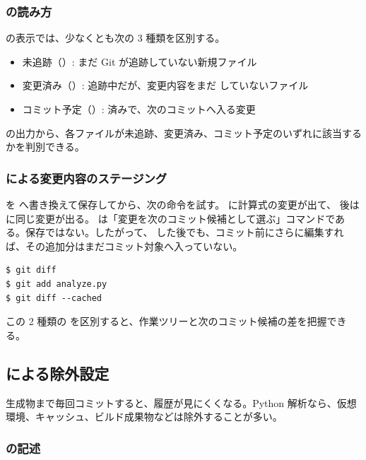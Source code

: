 \subsubsection{ の読み方}

 の表示では、少なくとも次の 3 種類を区別する。

\begin{itemize}
\item 未追跡（）: まだ Git が追跡していない新規ファイル
\item 変更済み（）: 追跡中だが、変更内容をまだ  していないファイル
\item コミット予定（）:  済みで、次のコミットへ入る変更
\end{itemize}

 の出力から、各ファイルが未追跡、変更済み、コミット予定のいずれに該当するかを判別できる。

\subsubsection{ による変更内容のステージング}

 を  へ書き換えて保存してから、次の命令を試す。 に計算式の変更が出て、 後は  に同じ変更が出る。 は「変更を次のコミット候補として選ぶ」コマンドである。保存ではない。したがって、 した後でも、コミット前にさらに編集すれば、その追加分はまだコミット対象へ入っていない。

\begin{lstlisting}[numbers=none, xleftmargin=2\zw]
$ git diff
$ git add analyze.py
$ git diff --cached
\end{lstlisting}

この 2 種類の  を区別すると、作業ツリーと次のコミット候補の差を把握できる。

\subsection{ による除外設定}

生成物まで毎回コミットすると、履歴が見にくくなる。Python 解析なら、仮想環境、キャッシュ、ビルド成果物などは除外することが多い。

\subsubsection{ の記述}

